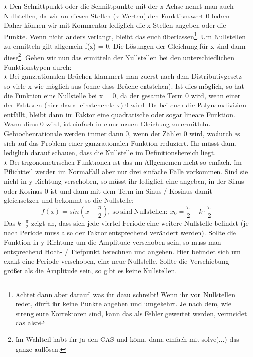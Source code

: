 		\(\star\) Den Schnittpunkt oder die Schnittpunkte mit der x-Achse nennt man
		auch Nullstellen, da wir an diesen Stellen (x-Werten) den Funktionswert 0
		haben. Daher können wir mit Kommentar lediglich die x-Stellen angeben oder die
		Punkte. Wenn nicht anders verlangt, bleibt das euch überlassen\footnote{Achtet
		dann aber darauf, was ihr dazu schreibt! Wenn ihr von Nullstellen redet, dürft
		ihr keine Punkte angeben und umgekehrt. Je nach dem, wie streng eure
		Korrektoren sind, kann das als Fehler gewertet werden, vermeidet das also}. Um
		Nullstellen zu ermitteln gilt allgemein f(x) = 0. Die Lösungen der Gleichung
		für x sind dann diese\footnote{Im Wahlteil habt ihr ja den CAS und könnt dann
		einfach mit solve(...) das ganze auflösen.}. Gehen wir nun das ermitteln der
		Nullstellen bei den unterschiedlichen Funktionstypen durch:\\

		\(\star\) Bei ganzrationalen Brüchen klammert man zuerst nach dem
		Distributivgesetz so viele x wie möglich aus (ohne dass Brüche entstehen). Ist
		dies möglich, so hat die Funktion eine Nullstelle bei x = 0, da der gesamte
		Term 0 wird, wenn einer der Faktoren (hier das alleinstehende x) 0 wird. Da bei
		euch die Polynomdivision entfällt, bleibt dann im Faktor eine quadratische
		oder sogar lineare Funktion. Wann diese 0 wird, ist einfach in einer neuen
		Gleichung zu ermitteln. Gebrochenrationale werden immer dann 0, wenn der
		Zähler 0 wird, wodurch es sich auf das Problem einer ganzrationalen Funktion
		reduziert. Ihr müsst dann lediglich darauf schauen, dass die Nullstelle im
		Definitionsbereich liegt.\\

		\(\star\) Bei trigonometrischen Funktionen ist das im Allgemeinen nicht so
		einfach. Im Pflichtteil werden im Normalfall aber nur drei einfache Fälle
		vorkommen. Sind sie nicht in y-Richtung verschoben, so müsst ihr lediglich
		eine angeben, in der Sinus oder Kosinus 0 ist und dann mit dem Term im Sinus /
		Kosinus damit gleichsetzen und bekommt so die Nullstelle:
		\[f(x)=sin(x+\frac{\pi}{2}),\mathrm{\ so\ sind\ Nullstellen:\
		}x_0=\frac{\pi}{2}+k\cdot \frac{\pi}{2}\]
		Das \(k\cdot \frac{\pi}{2}\) zeigt an, dass sich jede viertel Periode eine
		weitere Nullstelle befindet (je nach Periode muss also der Faktor entsprechend
		verändert werden). Sollte die Funktion in y-Richtung um die Amplitude
		verschoben sein, so muss man entsprechend Hoch- / Tiefpunkt berechnen und
		angeben. Hier befindet sich um exakt eine Periode verschoben, eine neue
		Nullstelle. Sollte die Verschiebung größer als die Amplitude sein, so gibt es
		keine Nullstellen.
		

